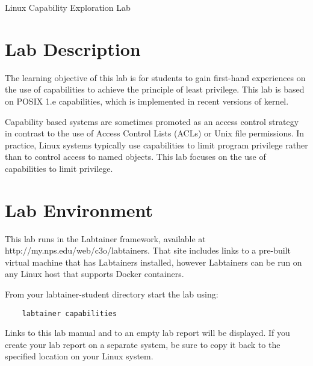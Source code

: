 




\begin{center}
{\LARGE Linux Capability Exploration Lab}
\end{center}

\copyrightnotice

\section{Lab Description}

The learning objective of this lab is for students
to gain first-hand experiences on the
use of capabilities to achieve the principle of least privilege.
This lab is based on POSIX 1.e capabilities, which is implemented in
recent versions of \linux kernel.

Capability based systems are sometimes promoted as an access control
strategy in contrast to the use of Access Control Lists (ACLs) or
Unix file permissions.  In practice, Linux systems typically use 
capabilities to limit program privilege rather than to control
access to named objects.  This lab focuses on the use of capabilities
to limit privilege.

\section{Lab Environment}
This lab runs in the Labtainer framework,
available at http://my.nps.edu/web/c3o/labtainers.
That site includes links to a pre-built virtual machine
that has Labtainers installed, however Labtainers can
be run on any Linux host that supports Docker containers.

From your labtainer-student directory start the lab using:
\begin{verbatim}
    labtainer capabilities
\end{verbatim}
Links to this lab manual and to an empty lab report will be displayed.  If you create your lab report on a separate system,
be sure to copy it back to the specified location on your Linux system.

